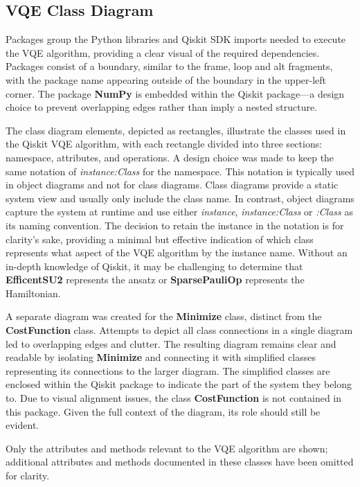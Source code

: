 \documentclass{article}
\begin{document}
\subsection{VQE Class Diagram}

Packages group the Python libraries and Qiskit SDK imports needed to execute the VQE algorithm, providing a clear visual of the required dependencies. Packages consist of a boundary, similar to the frame, loop and alt fragments, with the package name appearing outside of the boundary in the upper-left corner. The package \textbf{NumPy} is embedded within the Qiskit package—a design choice to prevent overlapping edges rather than imply a nested structure.

The class diagram elements, depicted as rectangles, illustrate the classes used in the Qiskit VQE algorithm, with each rectangle divided into three sections: namespace, attributes, and operations. A design choice was made to keep the same notation of \textit{instance:Class} for the namespace. This notation is typically used in object diagrams and not for class diagrams. Class diagrams provide a static system view and usually only include the class name. In contrast, object diagrams capture the system at runtime and use either \textit{instance}, \textit{instance:Class} or \textit{:Class} as its naming convention\cite{Seidl_Scholz_Huemer_Kappel_Duffy_2014}. The decision to retain the instance in the notation is for clarity's sake, providing a minimal but effective indication of which class represents what aspect of the VQE algorithm by the instance name. Without an in-depth knowledge of Qiskit, it may be challenging to determine that \textbf{EfficentSU2} represents the ansatz or \textbf{SparsePauliOp} represents the Hamiltonian.

A separate diagram was created for the \textbf{Minimize} class, distinct from the \textbf{CostFunction} class. Attempts to depict all class connections in a single diagram led to overlapping edges and clutter. The resulting diagram remains clear and readable by isolating \textbf{Minimize} and connecting it with simplified classes representing its connections to the larger diagram. The simplified classes are enclosed within the Qiskit package to indicate the part of the system they belong to. Due to visual alignment issues, the class \textbf{CostFunction} is not contained in this package. Given the full context of the diagram, its role should still be evident. 

Only the attributes and methods relevant to the VQE algorithm are shown; additional attributes and methods documented in these classes have been omitted for clarity.
\end{document}
